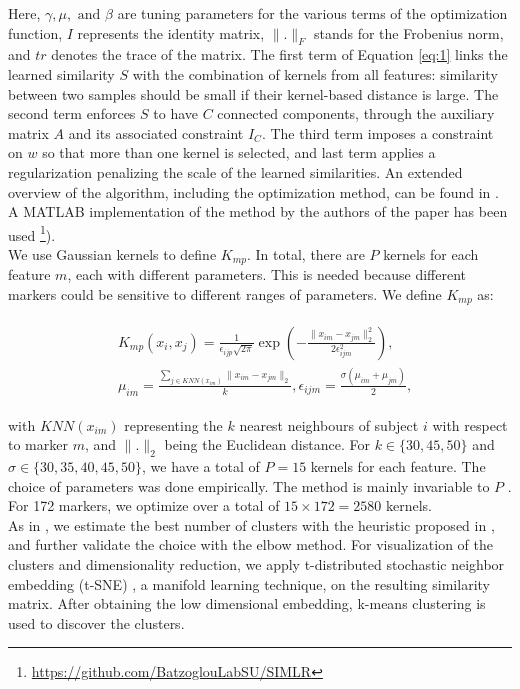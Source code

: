 Here, $\gamma, \mu, \text{ and } \beta$ are tuning parameters for the various terms of the optimization function, $I$ represents the identity matrix, $\| . \|_F$ stands for the Frobenius norm, and $tr$ denotes the trace of the matrix. The first term of Equation \ref{eq:1} links the learned similarity $S$ with the combination of kernels from all features: similarity between two samples should be small if their kernel-based distance is large. The second term enforces $S$ to have $C$ connected components, through the auxiliary matrix $A$ and its associated constraint $I_C$. The third term imposes a constraint on $w$ so that more than one kernel is selected, and last term applies a regularization penalizing the scale of the learned similarities. An extended overview of the algorithm, including the optimization method, can be found in \cite{Ramazzotti2018}. A MATLAB implementation of the method by the authors of the paper has been used \footnote{\url{https://github.com/BatzoglouLabSU/SIMLR}}). \\


We use Gaussian kernels to define $K_{mp}$. In total, there are $P$ kernels for each feature $m$, each with different parameters. This is needed because different markers could be sensitive to different ranges of parameters. We define $K_{mp}$ as:

\begin{align}
\begin{split}\label{eq:2}
{}&K_{mp}(x_i,x_j) = \frac{1}{\epsilon_{ijp}\sqrt{2\pi}} \exp \left( -\frac{\| x_{im} - x_{jm} \|^2_2}{2\epsilon_{ijm}^2}  \right), \\
{}&\mu_{im} = \frac{\sum_{j \in KNN(x_{im})} \| x_{im} - x_{jm} \|_2}{k}, \epsilon_{ijm}=\frac{\sigma(\mu_{im} + \mu_{jm})}{2},
\end{split}
\end{align}

with $KNN(x_{im})$ representing the $k$ nearest neighbours of subject $i$ with respect to marker $m$, and $\| .\|_2$ being the Euclidean distance. For $k\in \{30,45,50\}$ and $\sigma \in \{30,35,40,45,50\}$, we have a total of $P=15$ kernels for each feature. The choice of parameters was done empirically. The method is mainly invariable to $P$ \cite{Wang2017a}. For 172 markers, we optimize over a total of $15\times 172=2580$ kernels. \\

As in \cite{Ramazzotti2018}, we estimate the best number of clusters with the heuristic proposed in \cite{Zelnik-Manor}, and further validate the choice with the elbow method. For visualization of the clusters and dimensionality reduction, we apply t-distributed stochastic neighbor embedding (t-SNE) \cite{VanDerMaaten2008}, a manifold learning technique, on the resulting similarity matrix. After obtaining the low dimensional embedding, k-means clustering is used to discover the clusters. \\

